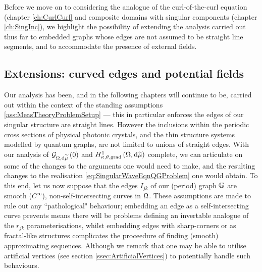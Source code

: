 Before we move on to considering the analogue of the curl-of-the-curl equation (chapter \ref{ch:CurlCurl} and composite domains with singular components (chapter \ref{ch:SingInc}), we highlight the possibility of extending the analysis carried out thus far to embedded graphs whose edges are not assumed to be straight line segments, and to accommodate the presence of external fields.

\subsection{Extensions: curved edges and potential fields} \label{ssec:CurvedEdges}
Our analysis has been, and in the following chapters will continue to be, carried out within the context of the standing assumptions \ref{ass:MeasTheoryProblemSetup} --- this in particular enforces the edges of our singular structure are straight lines.
However the inclusions within the periodic cross sections of physical photonic crystals, and the thin structure systems modelled by quantum graphs, are not limited to unions of straight edges.
With our analysis of $\mathcal{G}_{ \Omega, \mathrm{d}\widetilde{\mu}}\left( 0 \right)$ and $H^1_{\kappa,\theta,\mathrm{grad}}\left( \Omega, \mathrm{d}\widetilde{\mu} \right)$ complete, we can articulate on some of the changes to the arguments one would need to make, and the resulting changes to the realisation \eqref{eq:SingularWaveEqnQGProblem} one would obtain.
To this end, let us now suppose that the edges $I_{jk}$ of our (period) graph $\mathbb{G}$ are smooth ($C^{\infty}$), non-self-intersecting curves in $\Omega$.
These assumptions are made to rule out any ``pathological" behaviour; embedding an edge as a self-intersecting curve prevents means there will be problems defining an invertable analogue of the $r_{jk}$ parameterisations, whilst embedding edges with sharp-corners or as fractal-like structures complicates the proceedure of finding (smooth) approximating sequences.
Although we remark that one may be able to utilise artificial vertices (see section \ref{ssec:ArtificialVertices}) to potentially handle such behaviours.

